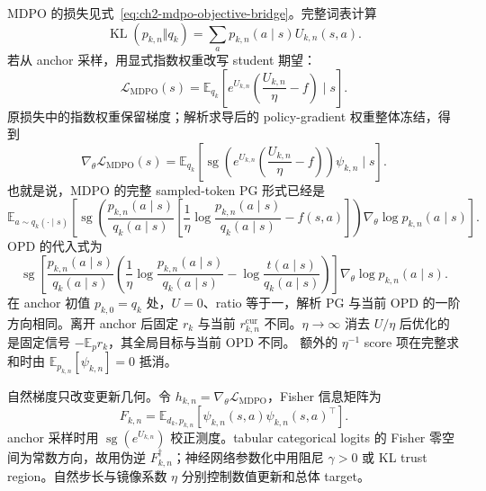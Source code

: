 \documentclass[lang=cn,scheme=chinese,openany]{../book/elegantbook}
\newcommand{\E}{\mathbb E}
\begin{document}
MDPO 的损失见式~\eqref{eq:ch2-mdpo-objective-bridge}。完整词表计算
\begin{equation}
\operatorname{KL}( p_{k,n}\Vert q_k)
=\sum_a p_{k,n}(a\mid s)U_{k,n}(s,a).
\label{eq:ch2-mdpo-full-kl}
\end{equation}
若从 anchor 采样，用显式指数权重改写 student 期望：
\begin{equation}
\mathcal L_{\mathrm{MDPO}}(s)
=\mathbb E_{ q_k}\left[e^{U_{k,n}}\left(\frac{U_{k,n}}\eta-f\right)\mid s\right].
\label{eq:ch2-mdpo-sample-integrand}
\end{equation}
原损失中的指数权重保留梯度；解析求导后的 policy-gradient 权重整体冻结，得到
\begin{equation}
\nabla_\theta\mathcal L_{\mathrm{MDPO}}(s)
=\mathbb E_{ q_k}\left[\operatorname{sg}\!\left(e^{U_{k,n}}\left(\frac{U_{k,n}}\eta-f\right)\right)\psi_{k,n}\mid s\right].
\label{eq:ch2-mdpo-generic-gradient}
\end{equation}
也就是说，MDPO 的完整 sampled-token PG 形式已经是
\begin{equation}
\label{eq:ch2-mdpo-pg}
\mathbb E_{a\sim q_k(\cdot\mid s)}\left[
\operatorname{sg}\!\left(
\frac{ p_{k,n}(a\mid s)}{ q_k(a\mid s)}
\left[\frac1\eta\log\frac{ p_{k,n}(a\mid s)}{ q_k(a\mid s)}-f(s,a)\right]
\right)\nabla_\theta\log p_{k,n}(a\mid s)\right].
\end{equation}
OPD 的代入式为
\begin{equation}
\label{eq:ch2-mdpo-opd-pg}
\operatorname{sg}\!\left[
\frac{ p_{k,n}(a\mid s)}{ q_k(a\mid s)}
\left(\frac1\eta\log\frac{ p_{k,n}(a\mid s)}{ q_k(a\mid s)}
-\log\frac{ t(a\mid s)}{ q_k(a\mid s)}\right)
\right]\nabla_\theta\log p_{k,n}(a\mid s).
\end{equation}
在 anchor 初值 $p_{k,0}=q_k$ 处，$U=0$、ratio 等于一，解析 PG 与当前 OPD 的一阶方向相同。离开 anchor 后固定 $r_k$ 与当前 $r_{k,n}^{\mathrm{cur}}$ 不同。$\eta\to\infty$ 消去 $U/\eta$ 后优化的是固定信号 $-\E_p r_k$，其全局目标与当前 OPD 不同。
额外的 $\eta^{-1}$ score 项在完整求和时由 $\mathbb E_{ p_{k,n}}[\psi_{k,n}]=0$ 抵消。

自然梯度只改变更新几何。令 $h_{k,n}=\nabla_\theta\mathcal L_{\mathrm{MDPO}}$，Fisher 信息矩阵为
\begin{equation*}
F_{k,n}=\mathbb E_{d_k, p_{k,n}}[\psi_{k,n}(s,a)\psi_{k,n}(s,a)^\top].
\end{equation*}
anchor 采样时用 $\operatorname{sg}(e^{U_{k,n}})$ 校正测度。tabular categorical logits 的 Fisher 零空间为常数方向，故用伪逆 $F_{k,n}^{\dagger}$；神经网络参数化中用阻尼 $\gamma>0$ 或 KL trust region。自然步长与镜像系数 $\eta$ 分别控制数值更新和总体 target。
\end{document}
